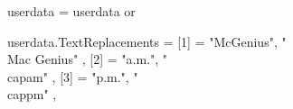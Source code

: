 %
%

\def\Mac{%
  \newbox\MacMBox%
  \setbox\MacMBox\hbox{M}%
  \newbox\MacCBox%
  \setbox\MacCBox\hbox{c}%
  \newbox\MacKernBox%
  \setbox\MacKernBox\hbox{\inframed[offset=\zeropoint, width=fit]{Mc}}%
  \def\MacDelta{\dimexpr\wd\MacKernBox-\wd\MacMBox-\wd\MacCBox\relax}%
  \def\MacUWidth{\dimexpr\wd\MacCBox-.75\MacDelta\relax}%
  \def\MacRule{\vrule width \MacUWidth height .04em depth \zeropoint \relax}%
  \def\MacKern{\dimexpr\wd\MacKernBox-\wd\MacMBox-\wd\MacCBox\relax}%
  \def\MacHeight{\dimexpr\ht\MacMBox-\ht\MacCBox\relax}%
  M{%
    \dontleavehmode{\raisebox{\MacHeight}\hbox{c}}%
    \kern-1.04\MacUWidth
    \MacRule
    \kern.08\MacUWidth
  }%
}%

\startluacode
userdata = userdata or {}

userdata.TextReplacements = { 
  [1] = { "McGenius", "\\Mac Genius" },
  [2] = { "a.m.", "\\cap{am}" },
  [3] = { "p.m.", "\\cap{pm}" },
}
\stopluacode

